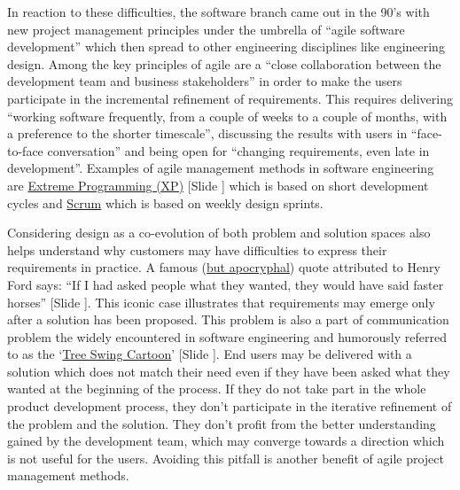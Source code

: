 \documentclass{article}
\newcounter{slide}
\begin{document}
In reaction to these difficulties, the software branch came out in the 90's with new project management principles under the umbrella of ``agile software development'' \cite{beck2001manifesto} which then spread to other engineering disciplines like engineering design. Among the key principles of agile are a ``close collaboration between the development team and business stakeholders'' in order to make the users participate in the incremental refinement of requirements. This requires delivering ``working software frequently, from a couple of weeks to a couple of months, with a preference to the shorter timescale'', discussing the results with users in ``face-to-face conversation'' and being open for ``changing requirements, even late in development''. Examples of agile management methods in software engineering are \href{https://en.wikipedia.org/wiki/Extreme_programming}{Extreme Programming (XP)} {\color{blue}[Slide ]} which is based on short development cycles and \href{https://en.wikipedia.org/wiki/Scrum_(software_development)}{Scrum} which is based on weekly design sprints.

Considering design as a co-evolution of both problem and solution spaces also helps understand why customers may have difficulties to express their requirements in practice. A famous (\href{https://quoteinvestigator.com/2011/07/28/ford-faster-horse/}{but apocryphal}) quote attributed to Henry Ford says: ``If I had asked people what they wanted, they would have said faster horses'' {\color{blue}[Slide ]}. This iconic case illustrates that requirements may emerge only after a solution has been proposed. This problem is also a part of communication problem the widely encountered in software engineering and humorously referred to as the `\href{https://en.wikipedia.org/wiki/Tree_swing_cartoon}{Tree Swing Cartoon}' {\color{blue}[Slide ]}. End users may be delivered with a solution which does not match their need even if they have been asked what they wanted at the beginning of the process. If they do not take part in the whole product development process, they don't participate in the iterative refinement of the problem and the solution. They don't profit from the better understanding gained by the development team, which may converge towards a direction which is not useful for the users. Avoiding this pitfall is another benefit of agile project management methods. 
\end{document}
